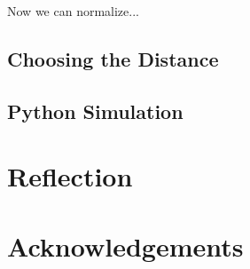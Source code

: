 \documentclass{article}
\begin{document}

Now we can normalize...

\subsection{Choosing the Distance}

\subsection{Python Simulation}

\section{Reflection}

\section{Acknowledgements}
\end{document}
